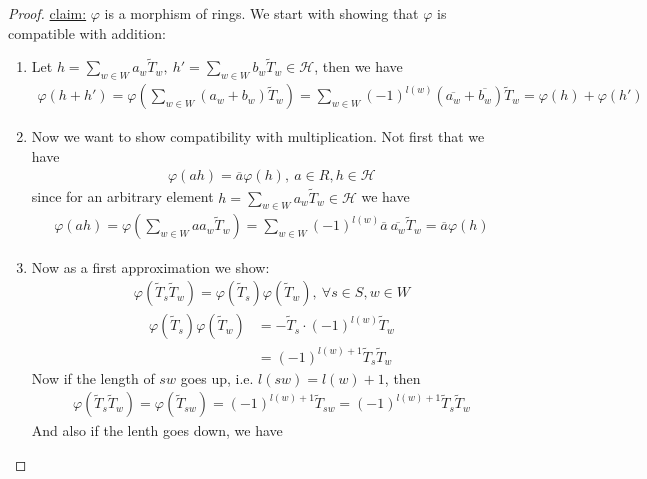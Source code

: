 \documentclass[]{article}
\begin{document}
\begin{proof}
    \underline{claim:} \(\varphi\) is a morphism of rings.
    We start with showing that \(\varphi\) is compatible with addition:
    \begin{enumerate}
        \item Let \(h = \sum_{w \in W}^{} a_w \widetilde{T}_w, \ h' = \sum_{w \in W}^{} b_w \widetilde{T}_w \in \mathscr{H}\), then we have
        \begin{align*}
            \varphi(h+h')= \varphi\left(\sum_{w \in W}^{} (a_w+b_w) \widetilde{T}_w\right) = \sum_{w \in W}^{} (-1)^{l(w)}(\overline{a_w}+\overline{b_w}) \widetilde{T}_w = \varphi(h)+ \varphi(h')
        \end{align*}
        \item Now we want to show compatibility with multiplication. Not first that we have
        \begin{align*}
            \varphi(a h ) = \overline{a} \varphi(h), \ a \in R, h \in \mathscr{H}
        \end{align*}
        since for an arbitrary element \(h = \sum_{w \in W}^{} a_w \widetilde{T}_w\in \mathscr{H}\) we have
        \begin{align*}
            \varphi(a h ) = \varphi\left(\sum_{w \in W}^{} a a_w \widetilde{T}_w\right) = \sum_{w \in W}^{} (-1)^{l(w)}\overline{a} \ \overline{a_w} \widetilde{T}_w = \overline{a} \varphi(h)
        \end{align*}
        \item Now as a first approximation we show:
        \begin{align*}
        \varphi(\widetilde{T}_s \widetilde{T}_w) = \varphi(\widetilde{T}_s) \varphi(\widetilde{T}_w), \ \forall s \in S, w \in W
        \end{align*}
        \begin{align*}
            \varphi(\widetilde{T}_s) \varphi(\widetilde{T}_w) &= - \widetilde{T}_s \cdot (-1)^{l(w)} \widetilde{T}_w \\
            & = (-1)^{l(w)+1} \widetilde{T}_s \widetilde{T}_w
        \end{align*}
        Now if the length of \(sw\) goes up, i.e. \(l(sw)=l(w)+1\), then
        \begin{align*}
            \varphi(\widetilde{T}_s \widetilde{T}_w) = \varphi(\widetilde{T}_{sw}) = (-1)^{l(w)+1} \widetilde{T}_{sw} = (-1)^{l(w)+1} \widetilde{T}_s \widetilde{T}_w
        \end{align*}
        And also if the lenth goes down, we have

\end{enumerate}
\end{proof}
\end{document}
